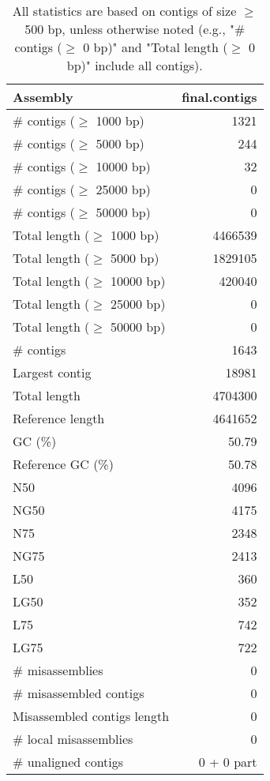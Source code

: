 \documentclass[12pt,a4paper]{article}
\begin{document}
\begin{table}[ht]
\begin{center}
\caption{All statistics are based on contigs of size $\geq$ 500 bp, unless otherwise noted (e.g., "\# contigs ($\geq$ 0 bp)" and "Total length ($\geq$ 0 bp)" include all contigs).}
\begin{tabular}{|l*{1}{|r}|}
\hline
Assembly & final.contigs \\ \hline
\# contigs ($\geq$ 1000 bp) & 1321 \\ \hline
\# contigs ($\geq$ 5000 bp) & 244 \\ \hline
\# contigs ($\geq$ 10000 bp) & 32 \\ \hline
\# contigs ($\geq$ 25000 bp) & 0 \\ \hline
\# contigs ($\geq$ 50000 bp) & 0 \\ \hline
Total length ($\geq$ 1000 bp) & 4466539 \\ \hline
Total length ($\geq$ 5000 bp) & 1829105 \\ \hline
Total length ($\geq$ 10000 bp) & 420040 \\ \hline
Total length ($\geq$ 25000 bp) & 0 \\ \hline
Total length ($\geq$ 50000 bp) & 0 \\ \hline
\# contigs & 1643 \\ \hline
Largest contig & 18981 \\ \hline
Total length & 4704300 \\ \hline
Reference length & 4641652 \\ \hline
GC (\%) & 50.79 \\ \hline
Reference GC (\%) & 50.78 \\ \hline
N50 & 4096 \\ \hline
NG50 & 4175 \\ \hline
N75 & 2348 \\ \hline
NG75 & 2413 \\ \hline
L50 & 360 \\ \hline
LG50 & 352 \\ \hline
L75 & 742 \\ \hline
LG75 & 722 \\ \hline
\# misassemblies & 0 \\ \hline
\# misassembled contigs & 0 \\ \hline
Misassembled contigs length & 0 \\ \hline
\# local misassemblies & 0 \\ \hline
\# unaligned contigs & 0 + 0 part \\ \hline

\end{tabular}
\end{center}
\end{table}
\end{document}
